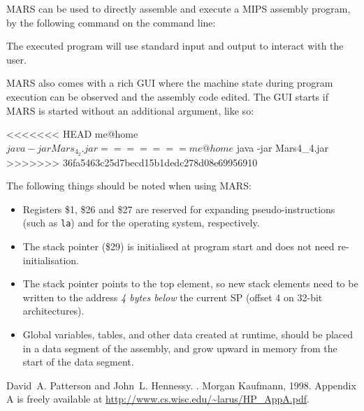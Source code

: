\documentclass[11pt,a4paper]{article}
\newcommand{\codesize}{\scriptsize}
\newcommand{\cd}[1]{{{\codesize\tt #1}}}
\begin{document}
MARS can be used to directly assemble and execute a MIPS assembly program, 
by the following command on the command line:
The executed program will use standard input and output to interact with the user.

MARS also comes with a rich GUI where the machine state during program execution can 
be observed and the assembly code edited. The GUI starts if MARS is started without
an additional argument, like so:
\begin{code}[fontsize=\normalsize]
<<<<<<< HEAD
me@home$ java -jar Mars_4_2.jar
=======
me@home$ java -jar Mars4_4.jar
>>>>>>> 36fa5463c25d7becd15b1dedc278d08e69956910
\end{code}

The following things should be noted when using MARS:

\begin{itemize}
\item Registers \$1, \$26 and \$27 are reserved for expanding pseudo-instructions
	(such as \cd{la}) and for the operating system, respectively.

\item The stack pointer (\$29) is initialised at program start and does not 
	need re-initialisation.

\item The stack pointer points to the top element, so new stack elements need to be
	written to the address \emph{4 bytes below} the current SP (offset 4 on 
	32-bit architectures).

\item Global variables, tables, and other data created at runtime, should be
	placed in a data segment of the assembly, and grow upward in memory from the
	start of the data segment.

\end{itemize}

\begin{thebibliography}{1}

David~A. Patterson and John~L. Hennessy.
.
\newblock Morgan Kaufmann, 1998.
\newline
\newblock Appendix A is freely available at 
\url{http://www.cs.wisc.edu/~larus/HP_AppA.pdf}.

\end{thebibliography}
\end{document}
